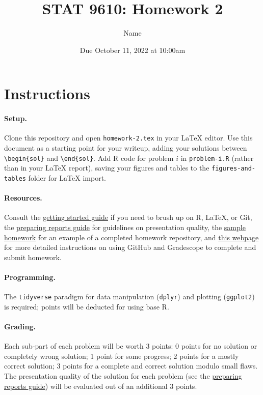\documentclass[11pt,letterpaper,english,oneside]{article} %
\author{Name}
\title{STAT 9610: Homework 2}
\date{Due October 11, 2022 at 10:00am}
\theoremstyle{definition} %
\newtheorem{solution}{Solution}
\newenvironment{sol}{\begin{solution}\hspace{0pt}}{\end{solution}}
\begin{document}
\maketitle

\section{Instructions}

\paragraph{Setup.} Clone this repository and open \verb|homework-2.tex| in your LaTeX editor. Use this document as a starting point for your writeup, adding your solutions between \verb|\begin{sol}| and \verb|\end{sol}|. Add R code for problem $i$ in \verb|problem-i.R| (rather than in your LaTeX report), saving your figures and tables to the \verb|figures-and-tables| folder for LaTeX import. 

\paragraph{Resources.}

Consult the \href{https://katsevich-teaching.github.io/stat-9610-fall-2022/assets/getting-started.pdf}{getting started guide} if you need to brush up on R, LaTeX, or Git, the \href{https://katsevich-teaching.github.io/stat-9610-fall-2022/assets/preparing-reports.pdf}{preparing reports guide} for guidelines on presentation quality, the \href{https://github.com/stat-9610-fall-2022/sample-homework-stat-9610}{sample homework} for an example of a completed homework repository, and \href{https://hmc-cs-131-spring2020.github.io/howtos/assignments.html}{this webpage} for more detailed instructions on using GitHub and Gradescope to complete and submit homework.

\paragraph{Programming.}

The \verb|tidyverse| paradigm for data manipulation (\verb|dplyr|) and plotting (\verb|ggplot2|) is required; points will be deducted for using base R. 

\paragraph{Grading.} Each sub-part of each problem will be worth 3 points: 0 points for no solution or completely wrong solution; 1 point for some progress; 2 points for a mostly correct solution; 3 points for a complete and correct solution modulo small flaws. The presentation quality of the solution for each problem (see the \href{https://katsevich-teaching.github.io/stat-9610-fall-2022/assets/preparing-reports.pdf}{preparing reports guide}) will be evaluated out of an additional 3 points.
\end{document}
